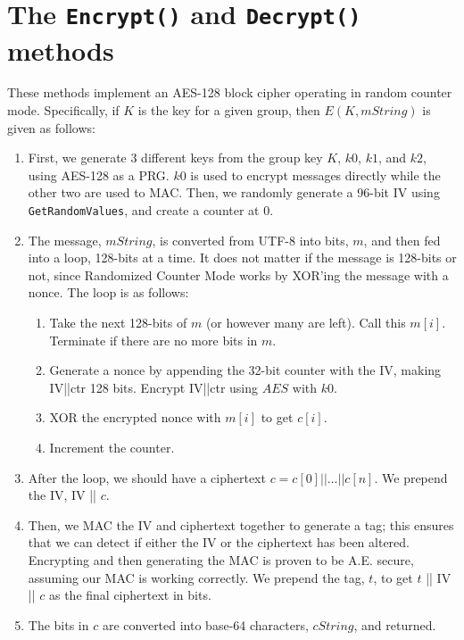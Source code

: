 \documentclass{amsart}
\begin{document}
\section{The \texttt{Encrypt()} and \texttt{Decrypt()} methods}%
These methods implement an AES-128 block cipher operating in random counter mode. Specifically, if $K$ is the key for a given group, then $E(K,mString)$ is given as follows:
\begin{enumerate}
\item First, we generate 3 different keys from the group key $K$, $k0$, $k1$, and $k2$, using AES-128 as a PRG. $k0$ is used to encrypt messages directly while the other two are used to MAC. Then, we randomly generate a 96-bit IV using \verb+GetRandomValues+, and create a counter at 0.
\item The message, $mString$, is converted from UTF-8 into bits, $m$, and then fed into a loop, 128-bits at a time. It does not matter if the message is 128-bits or not, since Randomized Counter Mode works by XOR'ing the message with a nonce. The loop is as follows:
  \begin{enumerate}
    \item Take the next 128-bits of $m$ (or however many are left). Call this $m[i]$. Terminate if there are no more bits in $m$.
    \item Generate a nonce by appending the 32-bit counter with the IV, making IV||ctr 128 bits. Encrypt IV||ctr using $AES$ with $k0$.
    \item XOR the encrypted nonce with $m[i]$ to get $c[i]$.
    \item Increment the counter.
  \end{enumerate}
\item After the loop, we should have a ciphertext $c = c[0] || \dots || c[n]$. We prepend the IV, IV || $c$.
\item Then, we MAC the IV and ciphertext together to generate a tag; this ensures that we can detect if either the IV or the ciphertext has been altered. Encrypting and then generating the MAC is proven to be A.E. secure, assuming our MAC is working correctly. We prepend the tag, $t$, to get $t$ || IV || $c$ as the final ciphertext in bits.
\item The bits in $c$ are converted into base-64 characters, $cString$, and returned.
\end{enumerate}


\end{document}
